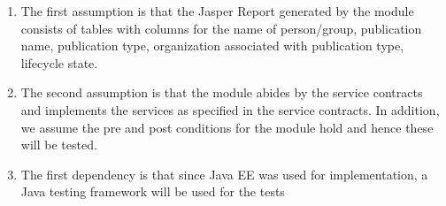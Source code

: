 \begin{enumerate}
	\item The first assumption is that the Jasper Report generated by the module consists of tables with columns for the name of person/group, publication name, publication type, organization associated with publication type, lifecycle state.
	\item The second assumption is that the module abides by the service contracts and implements the services as specified in the service contracts. In addition, we assume the pre and post conditions for the module hold and hence these will be tested.
	\item The first dependency is that since Java EE was used for implementation, a Java testing framework will be used for the tests
\end{enumerate}
